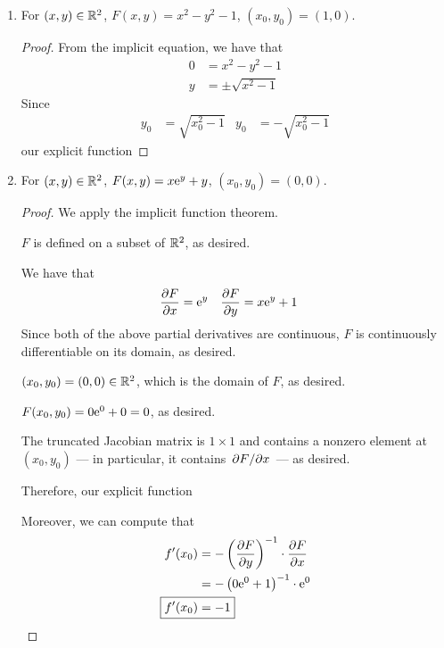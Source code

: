 \documentclass[../psets.tex]{subfiles}
\begin{document}
\begin{enumerate}
\begin{enumerate}
\begin{proof}
        \end{proof}
        \item For $(x,y)\in\R^2$, $F(x,y)=x^2-y^2-1$, $(x_0,y_0)=(1,0)$.
        \begin{proof}
            From the implicit equation, we have that
            \begin{align*}
                0 &= x^2-y^2-1\\
                y &= \pm\sqrt{x^2-1}
            \end{align*}
            Since
            \begin{align*}
                y_0 &= \sqrt{x_0^2-1}&
                y_0 &= -\sqrt{x_0^2-1}
            \end{align*}
            our explicit function 
        \end{proof}
        \item For $(x,y)\in\R^2$, $F(x,y)=x\e[y]+y$, $(x_0,y_0)=(0,0)$.
        \begin{proof}
            We apply the implicit function theorem.\par\smallskip
            $F$ is defined on a subset of $\R^2$, as desired.\par
            We have that
            \begin{align*}
                \pdv{F}{x} &= \e[y]&
                \pdv{F}{y} &= x\e[y]+1
            \end{align*}
            Since both of the above partial derivatives are continuous, $F$ is continuously differentiable on its domain, as desired.\par
            $(x_0,y_0)=(0,0)\in\R^2$, which is the domain of $F$, as desired.\par
            $F(x_0,y_0)=0\e[0]+0=0$, as desired.\par
            The truncated Jacobian matrix is $1\times 1$ and contains a nonzero element at $(x_0,y_0)$ --- in particular, it contains $\pdv*{F}{x}$ --- as desired.\par\smallskip
            Therefore, our explicit function \par\smallskip
            Moreover, we can compute that
            \begin{align*}
                f'(x_0) &= -\left( \pdv{F}{y}(x_0,y_0) \right)^{-1}\cdot\pdv{F}{x}(x_0,y_0)\\
                &= -\left( 0\e[0]+1 \right)^{-1}\cdot\e[0]\\
                \Aboxed{f'(x_0) &= -1}
            \end{align*}
        \end{proof}
    \end{enumerate}
\end{enumerate}
\end{document}

